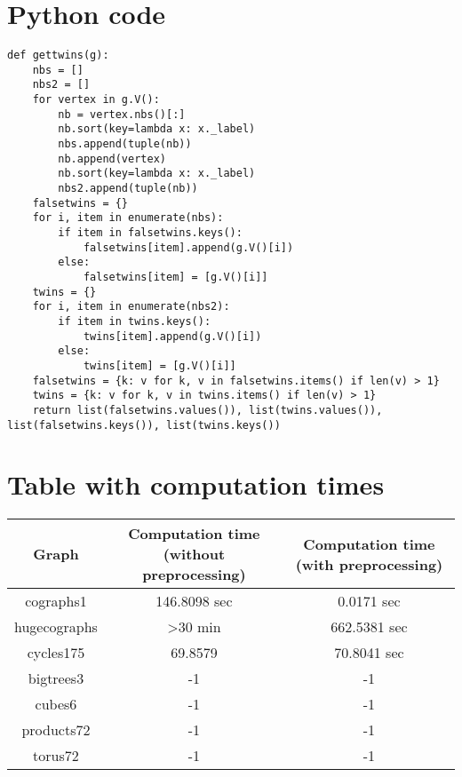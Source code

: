 \documentclass[twoside]{article}
\theoremstyle{definition}
\theoremstyle{plain}
\begin{document}
\begin{appendices}

\section{Python code}
\lstset{language=Python}
\begin{lstlisting}[label={gettwins}]
def gettwins(g):
    nbs = []
    nbs2 = []
    for vertex in g.V():
        nb = vertex.nbs()[:]
        nb.sort(key=lambda x: x._label)
        nbs.append(tuple(nb))
        nb.append(vertex)
        nb.sort(key=lambda x: x._label)
        nbs2.append(tuple(nb))
    falsetwins = {}
    for i, item in enumerate(nbs):
        if item in falsetwins.keys():
            falsetwins[item].append(g.V()[i])
        else:
            falsetwins[item] = [g.V()[i]]
    twins = {}
    for i, item in enumerate(nbs2):
        if item in twins.keys():
            twins[item].append(g.V()[i])
        else:
            twins[item] = [g.V()[i]]
    falsetwins = {k: v for k, v in falsetwins.items() if len(v) > 1}
    twins = {k: v for k, v in twins.items() if len(v) > 1}
    return list(falsetwins.values()), list(twins.values()), list(falsetwins.keys()), list(twins.keys())   
\end{lstlisting}

\section{Table with computation times}
\begin{tabular}{c|c|c}
Graph & Computation time (without preprocessing) & Computation time (with preprocessing) \\
\hline
cographs1 & 146.8098 sec & 0.0171 sec \\
hugecographs & >30 min & 662.5381 sec \\
cycles175 & 69.8579 & 70.8041 sec \\
bigtrees3 & -1 & -1\\
cubes6 & -1 & -1\\
products72 & -1 & -1\\
torus72 & -1 & -1\\

\end{tabular}



\end{appendices}
\end{document}
